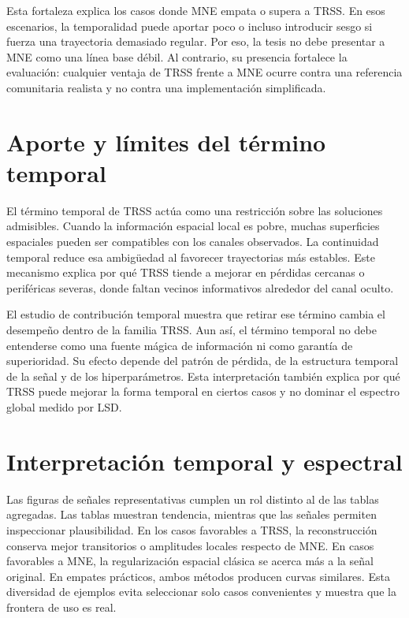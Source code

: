 Esta fortaleza explica los casos donde MNE empata o supera a TRSS. En esos escenarios, la temporalidad puede aportar poco o incluso introducir sesgo si fuerza una trayectoria demasiado regular. Por eso, la tesis no debe presentar a MNE como una línea base débil. Al contrario, su presencia fortalece la evaluación: cualquier ventaja de TRSS frente a MNE ocurre contra una referencia comunitaria realista y no contra una implementación simplificada.

\section{Aporte y límites del término temporal}

El término temporal de TRSS actúa como una restricción sobre las soluciones admisibles. Cuando la información espacial local es pobre, muchas superficies espaciales pueden ser compatibles con los canales observados. La continuidad temporal reduce esa ambigüedad al favorecer trayectorias más estables. Este mecanismo explica por qué TRSS tiende a mejorar en pérdidas cercanas o periféricas severas, donde faltan vecinos informativos alrededor del canal oculto.

El estudio de contribución temporal muestra que retirar ese término cambia el desempeño dentro de la familia TRSS. Aun así, el término temporal no debe entenderse como una fuente mágica de información ni como garantía de superioridad. Su efecto depende del patrón de pérdida, de la estructura temporal de la señal y de los hiperparámetros. Esta interpretación también explica por qué TRSS puede mejorar la forma temporal en ciertos casos y no dominar el espectro global medido por LSD.

\section{Interpretación temporal y espectral}

Las figuras de señales representativas cumplen un rol distinto al de las tablas agregadas. Las tablas muestran tendencia, mientras que las señales permiten inspeccionar plausibilidad. En los casos favorables a TRSS, la reconstrucción conserva mejor transitorios o amplitudes locales respecto de MNE. En casos favorables a MNE, la regularización espacial clásica se acerca más a la señal original. En empates prácticos, ambos métodos producen curvas similares. Esta diversidad de ejemplos evita seleccionar solo casos convenientes y muestra que la frontera de uso es real.

